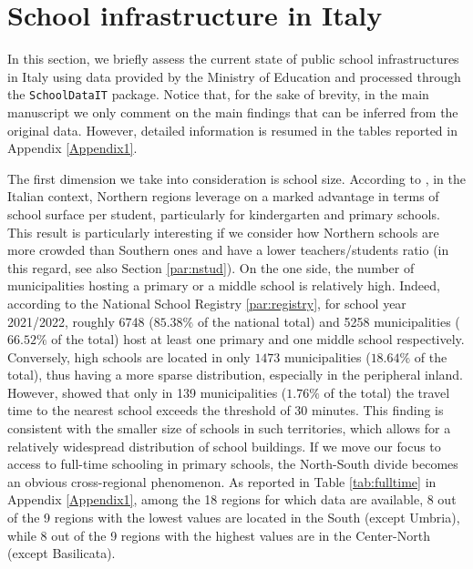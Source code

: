 \documentclass{article}%
\begin{document}
\section{School infrastructure in Italy} \label{sec:Overview}


In this section, we briefly assess the current state of public school infrastructures in Italy using data provided by the Ministry of Education and processed through the \texttt{SchoolDataIT} package. Notice that, for the sake of brevity, in the main manuscript we only comment on the main findings that can be inferred from the original data. However, detailed information is resumed in the tables reported in Appendix \ref{Appendix1}.

The first dimension we take into consideration is school size. According to \cite{BDI}, in the Italian context, Northern regions leverage on a marked advantage in terms of school surface per student, particularly for kindergarten and primary schools. This result is particularly interesting if we consider how Northern schools are more crowded than Southern ones and have a lower teachers/students ratio (in this regard, see also Section \ref{par:nstud}). On the one side, the number of municipalities hosting a primary or a middle school is relatively high. Indeed, according to the National School Registry \ref{par:registry}, for school year 2021/2022, roughly 6748 ($85.38\%$ of the national total) and 5258 municipalities ($66.52\%$ of the total) host at least one primary and one middle school respectively. Conversely, high schools are located in only $1473$ municipalities ($18.64\%$ of the total), thus having a more sparse distribution, especially in the peripheral inland. However, \cite{BDI} showed that only in 139 municipalities ($1.76\%$ of the total) the travel time to the nearest school exceeds the threshold of 30 minutes. This finding is consistent with the smaller size of schools in such territories, which allows for a relatively widespread distribution of school buildings. If we move our focus to access to full-time schooling in primary schools, the North-South divide becomes an obvious cross-regional phenomenon. As reported in Table \ref{tab:fulltime} in Appendix \ref{Appendix1}, among the 18 regions for which data are available, 8 out of the 9 regions with the lowest values are located in the South (except Umbria), while 8 out of the 9 regions with the highest values are in the Center-North (except Basilicata).
\end{document}
